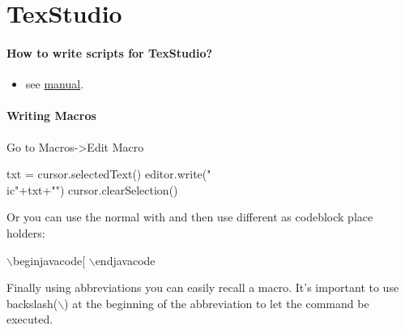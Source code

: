 \section{TexStudio}

\paragraph{How to write scripts for TexStudio?}
\begin{itemize}
	\item see \href{http://texstudio.sourceforge.net/manual/current/usermanual_en.html#SECTION33}{manual}.
\end{itemize}

\paragraph{Writing Macros}
Go to Macros->Edit Macro

\begin{javacode}[]
txt = cursor.selectedText()
editor.write("\\ic{"+txt+"}")
cursor.clearSelection()
\end{javacode}

Or you can use the normal with and then use different  as codeblock place holders:

\begin{javacode}
	$\backslash$begin{javacode}[%
	$\backslash$end{javacode}
\end{javacode}

Finally using abbreviations you can easily recall a macro. It's important to use backslash($\backslash$) at the beginning of the abbreviation to let the command be executed.
